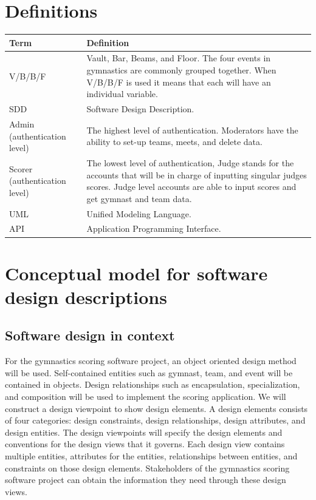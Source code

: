 \documentclass[letterpaper,10pt,draftclsnofoot,onecolumn,]{article}
\begin{document}
\section{Definitions}
\begin{center}
    \begin{tabular} { | p{10em} | p{40em} | }
    \hline
    \textbf{Term} & \textbf{Definition} \\
    \hline
    V/B/B/F & Vault, Bar, Beams, and Floor. The four events in gymnastics are commonly grouped together. When V/B/B/F is used it means that each will have an individual variable. \\
    \hline
    SDD & Software Design Description. \\
    \hline
    Admin (authentication level) & The highest level of authentication. Moderators have the ability to set-up teams, meets, and delete data. \\
    \hline
    Scorer (authentication level) & The lowest level of authentication, Judge stands for the accounts that will be in charge of inputting singular judges scores. Judge level accounts are able to input scores and get gymnast and team data. \\
    \hline
    UML & Unified Modeling Language. \\
    \hline
    API & Application Programming Interface. \\
    \hline
    \end{tabular}
\end{center}


\section{Conceptual model for software design descriptions}

\subsection{Software design in context}
For the gymnastics scoring software project, an object oriented design method will be used. Self-contained entities such as gymnast, team, and event will be contained in objects. Design relationships such as encapsulation, specialization, and composition will be used to implement the scoring application. We will construct a design viewpoint to show design elements. A design elements consists of four categories: design constraints, design relationships, design attributes, and design entities. The design viewpoints will specify the design elements and conventions for the design views that it governs. Each design view contains multiple entities, attributes for the entities, relationships between entities, and constraints on those design elements. Stakeholders of the gymnastics scoring software project can obtain the information they need through these design views.
\end{document}
